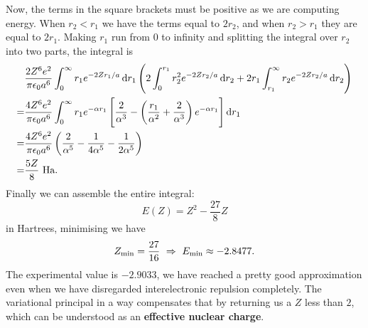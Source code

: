 Now, the terms in the square brackets must be positive as we are computing 
energy. When $r_2<r_1$ we have the terms equal to $2r_2$, and when $r_2>r_1$ 
they are equal to $2r_1$. Making $r_1$ run from $0$ to infinity and splitting 
the integral over $r_2$ into two parts, the integral is 
\begin{equation}
\label{5z8}
\begin{aligned}
&\frac{2Z^6e^2}{\pi\epsilon_0a^6}\intinfp r_1e^{-2Zr_1/a}\dif r_1\lf(2\int_0^{r_1}r_2^2e^{-2Zr_2/a}\dif r_2+2r_1\int_{r_1}^{\inf}r_2e^{-2Zr_2/a}\dif r_2 \rt)\\
=&\frac{4Z^6e^2}{\pi\epsilon_0a^6}\intinfp r_1e^{-\alpha r_1}\lf[\frac{2}{\alpha^3}-\lf(\frac{r_1}{\alpha^2}+\frac{2}{\alpha^3} \rt)e^{-\alpha r_1} \rt]\dif r_1\\
=&\frac{4Z^6e^2}{\pi\epsilon_0a^6}\lf(\frac{2}{\alpha^5}-\frac{1}{4\alpha^5}-\frac{1}{2\alpha^5} \rt)\\
=&\frac{5Z}{8}\ \text{Ha}.
\end{aligned}
\end{equation}
Finally we can assemble the entire integral:
\begin{equation}
E(Z)=Z^2-\frac{27}{8}Z
\end{equation}
in Hartrees, minimising we have
\begin{equation}
Z_{\text{min}}=\frac{27}{16}\ \imp\ E_{\text{min}}\approx-2.8477.
\end{equation}
The experimental value is $-2.9033$, we have reached a pretty good approximation 
even when we have disregarded interelectronic repulsion completely. The 
variational principal in a way compensates that by returning us a $Z$ less 
than $2$, which can be understood as an \textbf{effective nuclear charge}.
